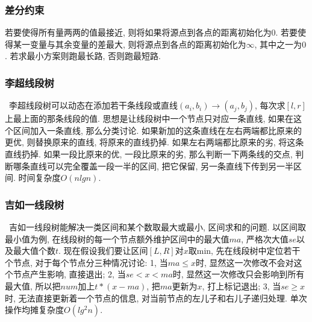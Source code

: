 \subsubsection{差分约束}若要使得所有量两两的值最接近, 则将如果将源点到各点的距离初始化为$0$.  若要使得某一变量与其余变量的差最大, 则将源点到各点的距离初始化为$∞$, 其中之一为$0$.  若求最小方案则跑最长路, 否则跑最短路. 
\begin{comment}
\subsubsection{斯坦纳树}\
		在一个无向带权图$G=(V,E)$中, 将指定的$k$个点连通的一颗树称为\textbf{斯坦纳树}, 边权总和最小的斯坦纳树称为最小斯坦纳树. 
		\par 我们可以用DP+SPFA的方法求解斯坦纳树. 用$F_{i,state}$表示以$i$为根, 指定集合中的点的联通状态为$state$的生成树的最小总权值, 有两种转移方程. 
		\par 第一种, 通过两个子集合并进行转移, 即$F_{i,state}=min(F_{i,subset1} + F_{i,subset2})$, 这一部分使用DP完成. 
		\par 第二种, 在当前的联通状态下, 对该联通状态进行松弛操作, 即${F_{i,state}=min(F_{i,state},F_{j,state}+w(i,j))}$, 这一部分使用SPFA完成. 
        \par 时间复杂度$O(V*3^k+cE*2^k)$, $c$为SPFA复杂度中的常数. 
\end{comment}
\subsubsection{李超线段树}\
        李超线段树可以动态在添加若干条线段或直线$(a_i,b_i)\to (a_j,b_j)$, 每次求$[l,r]$上最上面的那条线段的值. 思想是让线段树中一个节点只对应一条直线, 如果在这个区间加入一条直线, 那么分类讨论. 如果新加的这条直线在左右两端都比原来的更优, 则替换原来的直线, 将原来的直线扔掉. 如果左右两端都比原来的劣, 将这条直线扔掉. 如果一段比原来的优, 一段比原来的劣, 那么判断一下两条线的交点, 判断哪条直线可以完全覆盖一段一半的区间, 把它保留, 另一条直线下传到另一半区间. 时间复杂度$O(nlgn)$. 
\subsubsection{吉如一线段树}\
        吉如一线段树能解决一类区间和某个数取最大或最小, 区间求和的问题. 以区间取最小值为例, 在线段树的每一个节点额外维护区间中的最大值$ma$, 严格次大值$se$以及最大值个数$t$. 现在假设我们要让区间$[L,R]$对$x$取min, 先在线段树中定位若干个节点, 对于每个节点分三种情况讨论: 1, 当$ma\leq x$时, 显然这一次修改不会对这个节点产生影响, 直接退出; 2, 当$se<x<ma$时, 显然这一次修改只会影响到所有最大值, 所以把$num$加上$t*(x-ma)$, 把$ma$更新为$x$, 打上标记退出; 3, 当$se\geq x$时, 无法直接更新着一个节点的信息, 对当前节点的左儿子和右儿子递归处理. 单次操作均摊复杂度$O(lg^2n)$. 

